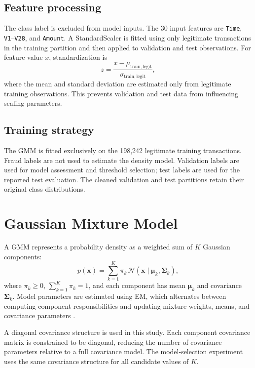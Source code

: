 \documentclass[conference]{IEEEtran}
\begin{document}
\subsection{Feature processing}
The class label is excluded from model inputs. The 30 input features are \texttt{Time}, \texttt{V1}--\texttt{V28}, and \texttt{Amount}. A StandardScaler is fitted using only legitimate transactions in the training partition and then applied to validation and test observations. For feature value $x$, standardization is
\begin{equation}
z=\frac{x-\mu_{\mathrm{train,legit}}}{\sigma_{\mathrm{train,legit}}},
\end{equation}
where the mean and standard deviation are estimated only from legitimate training observations. This prevents validation and test data from influencing scaling parameters.

\subsection{Training strategy}
The GMM is fitted exclusively on the 198,242 legitimate training transactions. Fraud labels are not used to estimate the density model. Validation labels are used for model assessment and threshold selection; test labels are used for the reported test evaluation. The cleaned validation and test partitions retain their original class distributions.

\section{Gaussian Mixture Model}
A GMM represents a probability density as a weighted sum of $K$ Gaussian components:
\begin{equation}
p(\mathbf{x})=\sum_{k=1}^{K}\pi_k\,\mathcal{N}(\mathbf{x}\mid\boldsymbol{\mu}_k,\boldsymbol{\Sigma}_k),
\label{eq:gmm}
\end{equation}
where $\pi_k\geq 0$, $\sum_{k=1}^{K}\pi_k=1$, and each component has mean $\boldsymbol{\mu}_k$ and covariance $\boldsymbol{\Sigma}_k$. Model parameters are estimated using EM, which alternates between computing component responsibilities and updating mixture weights, means, and covariance parameters \cite{dempster1977}.

A diagonal covariance structure is used in this study. Each component covariance matrix is constrained to be diagonal, reducing the number of covariance parameters relative to a full covariance model. The model-selection experiment uses the same covariance structure for all candidate values of $K$.
\end{document}
